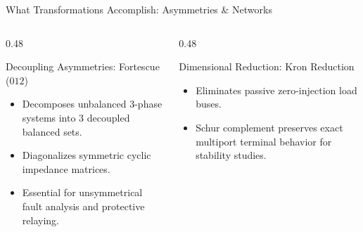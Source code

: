 \begin{frame}{What Transformations Accomplish: Asymmetries \& Networks}
    \begin{columns}
        \begin{column}{0.48\textwidth}
            \begin{block}{Decoupling Asymmetries: Fortescue ($012$)}
                \begin{itemize}
                    \item Decomposes unbalanced 3-phase systems into 3 decoupled balanced sets.
                    \item Diagonalizes symmetric cyclic impedance matrices.
                    \item Essential for unsymmetrical fault analysis and protective relaying.
                \end{itemize}
            \end{block}
        \end{column}
        \begin{column}{0.48\textwidth}
            \begin{block}{Dimensional Reduction: Kron Reduction}
                \begin{itemize}
                    \item Eliminates passive zero-injection load buses.
                    \item Schur complement preserves exact multiport terminal behavior for stability studies.
                \end{itemize}
            \end{block}
        \end{column}
    \end{columns}
\end{frame}

